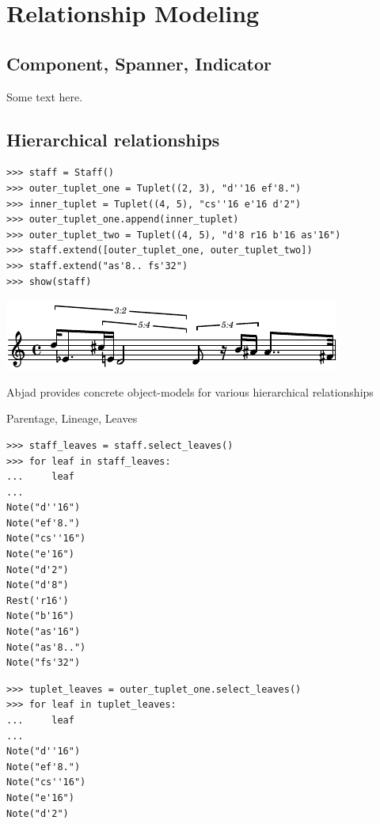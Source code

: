 \section{Relationship Modeling}\label{sec:relationship_modeling}

\subsection{Component, Spanner, Indicator}

Some text here.

\subsection{Hierarchical relationships}

\begin{lstlisting}
>>> staff = Staff()
>>> outer_tuplet_one = Tuplet((2, 3), "d''16 ef'8.")
>>> inner_tuplet = Tuplet((4, 5), "cs''16 e'16 d'2")
>>> outer_tuplet_one.append(inner_tuplet)
>>> outer_tuplet_two = Tuplet((4, 5), "d'8 r16 b'16 as'16")
>>> staff.extend([outer_tuplet_one, outer_tuplet_two])
>>> staff.extend("as'8.. fs'32")
>>> show(staff)
\end{lstlisting}

\includegraphics[scale=1.0]{images/section_4_relationship_modeling-1.pdf}


Abjad provides concrete object-models for various hierarchical relationships

Parentage, Lineage, Leaves

\begin{lstlisting}
>>> staff_leaves = staff.select_leaves()
>>> for leaf in staff_leaves:
...     leaf
... 
Note("d''16")
Note("ef'8.")
Note("cs''16")
Note("e'16")
Note("d'2")
Note("d'8")
Rest('r16')
Note("b'16")
Note("as'16")
Note("as'8..")
Note("fs'32")
\end{lstlisting}


\begin{lstlisting}
>>> tuplet_leaves = outer_tuplet_one.select_leaves()
>>> for leaf in tuplet_leaves:
...     leaf
... 
Note("d''16")
Note("ef'8.")
Note("cs''16")
Note("e'16")
Note("d'2")
\end{lstlisting}


